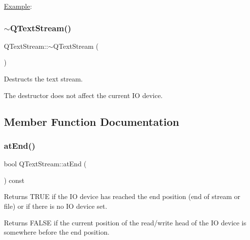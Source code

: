 \mbox{\hyperlink{struct_example}{Example}}\+: 
\begin{DoxyCode}{0}
\end{DoxyCode}
 \mbox{\label{class_q_text_stream_a5c3a2ab73dceff949ec36db41df64944}} 
\subsubsection{\texorpdfstring{$\sim$QTextStream()}{~QTextStream()}}
{\footnotesize\ttfamily Q\+Text\+Stream\+::$\sim$\+Q\+Text\+Stream (\begin{DoxyParamCaption}{ }\end{DoxyParamCaption})\hspace{0.3cm}{\ttfamily [virtual]}}

Destructs the text stream.

The destructor does not affect the current IO device. 

\subsection{Member Function Documentation}
\mbox{\label{class_q_text_stream_a07ba00c9cec9d02ccb9bef9832932c9e}} 
\subsubsection{\texorpdfstring{atEnd()}{atEnd()}}
{\footnotesize\ttfamily bool Q\+Text\+Stream\+::at\+End (\begin{DoxyParamCaption}{ }\end{DoxyParamCaption}) const\hspace{0.3cm}{\ttfamily [inline]}}

Returns T\+R\+UE if the IO device has reached the end position (end of stream or file) or if there is no IO device set.

Returns F\+A\+L\+SE if the current position of the read/write head of the IO device is somewhere before the end position.

